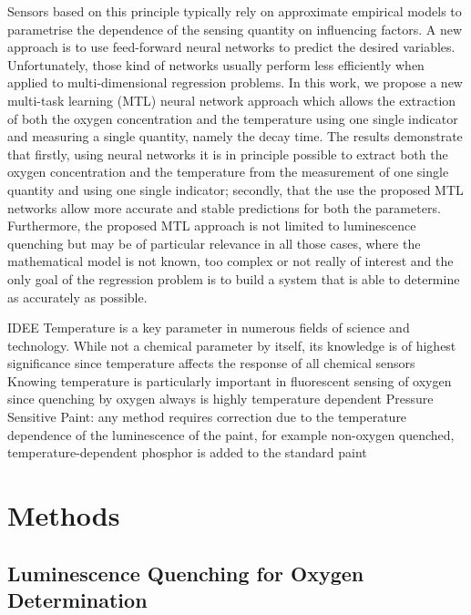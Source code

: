 \documentclass[9pt,twocolumn,twoside,pdftex]{optica}
\begin{document}
Sensors based on this principle typically rely on approximate empirical models to parametrise the dependence of the sensing quantity on influencing factors. A new approach is to use feed-forward neural networks to predict the desired variables. Unfortunately, those kind of networks usually perform less efficiently when applied to multi-dimensional regression problems. In this work, we propose a new multi-task learning (MTL) neural network approach which allows the extraction of both the oxygen concentration and the temperature using one single indicator and measuring a single quantity, namely the decay time. The results demonstrate that firstly, using neural networks it is in principle possible to extract both the oxygen concentration and the temperature from the measurement of one single quantity and using one single indicator; secondly, that the use the proposed MTL networks allow more accurate and stable predictions for both the parameters. Furthermore, the proposed MTL approach is not limited to luminescence quenching but may be of particular relevance in all those cases, where the mathematical model is not known, too complex or not really of interest and the only goal of the regression problem is to build a system that is able to determine as accurately as possible.


IDEE
Temperature is a key parameter in numerous fields of science and technology. While not a chemical parameter by itself, its knowledge is of highest significance since temperature affects the response of all chemical sensors
Knowing temperature is particularly important in fluorescent sensing of oxygen since quenching by oxygen always is highly temperature dependent
Pressure Sensitive Paint: any method requires correction due to the temperature dependence of the luminescence of the paint, for example non-oxygen quenched,  temperature-dependent  phosphor  is  added  to  the  standard  paint

\section{Methods}
\label{sec:methods}

\subsection{Luminescence Quenching for Oxygen Determination}
\label{Theory}
\end{document}
